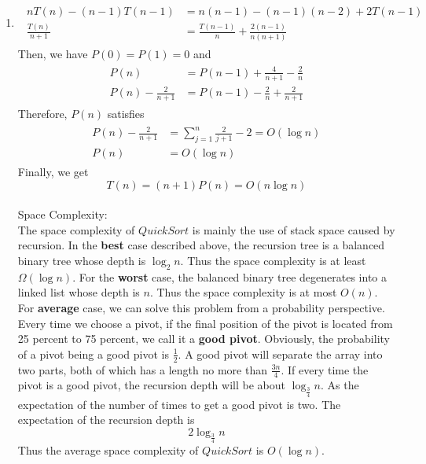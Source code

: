 \documentclass[12pt,a4paper]{article}
\makeatletter
\newtheorem*{solution}{Solution}
\theoremstyle{definition}
\renewenvironment{solution}[1][Solution] {\par\pushQED{\qed}\normalfont\topsep6\p@\@plus6\p@\relax\trivlist\item[\hskip\labelsep\bfseries#1\@addpunct{.}]\ignorespaces}{\popQED\endtrivlist\@endpefalse} \makeatother
\makeatother
\begin{document}
\begin{enumerate}
\begin{solution}
\begin{enumerate}
\begin{align}
\begin{split}
           nT(n) - (n-1)T(n-1) &= n(n-1)-(n-1)(n-2)+2T(n-1)\\
           \frac{T(n)}{n+1} &= \frac{T(n-1)}{n}+\frac{2(n-1)}{n(n+1)}
        \end{split}
       \end{align}
       Then, we have $P(0)=P(1)= 0$ and
       \begin{align} 
        \begin{split}
           P(n) &= P(n-1) + \frac{4}{n+1} - \frac{2}{n}\\
           P(n)- \frac{2}{n+1}&=P(n-1)- \frac{2}{n} + \frac{2}{n+1}
        \end{split}
       \end{align}
       Therefore, $P(n)$ satisfies
       \begin{align}
        \begin{split}
           P(n)- \frac{2}{n+1} &= \sum_{j = 1}^{n}\frac{2}{j+1}-2 = O(\log n)\\
           P(n)&=O(\log n)
        \end{split}
       \end{align}
       Finally, we get
       \begin{equation}
           T(n )= (n+1)P(n) = O(n\log n)
       \end{equation}
       ~\\
       Space Complexity:\\
       The space complexity of $QuickSort$ is mainly the use of stack space caused by recursion. In the \textbf{best} case described above, the recursion tree is a balanced binary tree whose depth is $\log_2 n$. Thus the space complexity is at least $\Omega(\log n)$. For the \textbf{worst} case, the balanced binary tree degenerates into a linked list whose depth is $n$. Thus the space complexity is at most $O(n)$. For \textbf{average} case, we can solve this problem from a probability perspective. Every time we choose a pivot, if the final position of the pivot is located from 25 percent to 75 percent, we call it a \textbf{good pivot}. Obviously, the probability of a pivot being a good pivot is $\frac{1}{2}$. A good pivot will separate the array into two parts, both of which has a length no more than $\frac{3n}{4}$. If every time the pivot is a good pivot, the recursion depth will be about $\log_{\frac{3}{4}}n$. As the expectation of the number of times to get a good pivot is two. The expectation of the recursion depth is 
       \begin{equation}
           2\log_{\frac{3}{4}}n
       \end{equation}
       Thus the average space complexity of $QuickSort$ is $O(\log n)$.\\
       

\end{enumerate}
\end{solution}
\end{enumerate}
\end{document}
